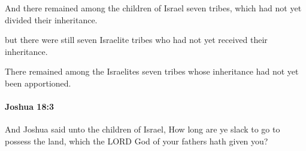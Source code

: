 			\begin{versebox}
					\item[BHS] 
					\item[ASV] And there remained among the children of Israel seven tribes, which had not yet divided their inheritance.
					\item[NIV] but there were still seven Israelite tribes who had not yet received their inheritance.
					\item[NRSV] There remained among the Israelites seven tribes whose inheritance had not yet been apportioned.
			\end{versebox}

		\paragraph{Joshua 18:3} %
			\label{JOSHUA-18-3}

			And Joshua said unto the children of Israel, How long are ye slack to go to possess the land, which the LORD God of your fathers hath given you?

